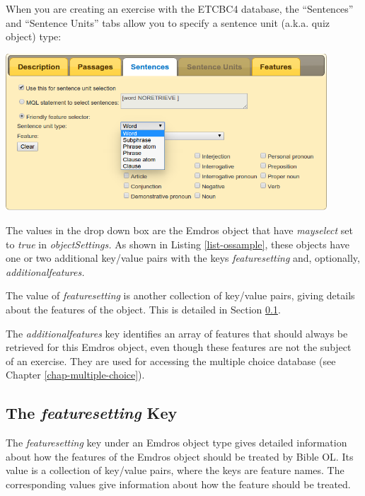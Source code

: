 \documentclass[11pt,oneside,a4paper]{memoir}
\begin{document}
When you are creating an exercise with the ETCBC4 database, the ``Sentences'' and ``Sentence Units''
tabs allow you to specify a sentence unit (a.k.a. quiz object) type:

\begin{center}
  \includegraphics[width=0.9\textwidth]{senselect.png}
\end{center}

The values in the drop down box are the Emdros object that have \emph{mayselect} set to \emph{true}
in \emph{objectSettings.} As shown in Listing \ref{list-ossample}, these objects have one or
two additional key/value pairs with the keys \emph{featuresetting} and, optionally,
\emph{additionalfeatures.}

The value of \emph{featuresetting} is another collection of key/value pairs, giving
details about the features of the object. This is detailed in Section \ref{sec-featuresetting}.

The \emph{additionalfeatures} key identifies an array of features that should always be retrieved
for this Emdros object, even though these features are not the subject of an exercise. They are used
for accessing the multiple choice database (see Chapter \ref{chap-multiple-choice}).

\subsection{The \emph{featuresetting} Key}\label{sec-featuresetting}

The \emph{featuresetting} key under an Emdros object type gives detailed information about how the
features of the Emdros object should be treated by Bible OL. Its value is a collection of key/value
pairs, where the keys are feature names. The corresponding values give
information about how the feature should be treated.
\end{document}

